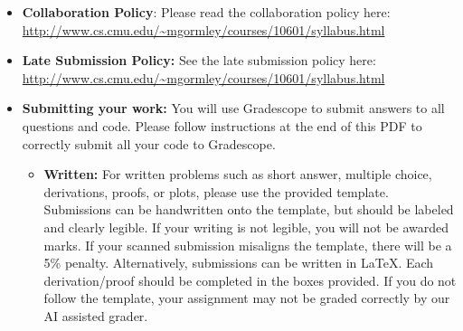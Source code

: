 \documentclass[11pt,addpoints,answers]{exam}
\begin{document}
\begin{itemize}

\item \textbf{Collaboration Policy}: Please read the collaboration policy here: \url{http://www.cs.cmu.edu/~mgormley/courses/10601/syllabus.html}

\item\textbf{Late Submission Policy:} See the late submission policy here: \url{http://www.cs.cmu.edu/~mgormley/courses/10601/syllabus.html}

\item\textbf{Submitting your work:} You will use Gradescope to submit
  answers to all questions and code. Please
  follow instructions at the end of this PDF to correctly submit all your code to Gradescope.

  \begin{itemize}
    

    
   \item \textbf{Written:} For written problems such as short answer, multiple choice, derivations, proofs, or plots, please use the provided template. Submissions can be handwritten onto the template, but should be labeled and clearly legible. If your writing is not legible, you will not be awarded marks. If your scanned submission misaligns the template, there will be a 5\% penalty. Alternatively, submissions can be written in LaTeX. 
   Each derivation/proof should be completed in the boxes provided. If you do not follow the template, your assignment may not be graded correctly by our AI assisted grader.


\end{itemize}
\end{itemize}
\end{document}
